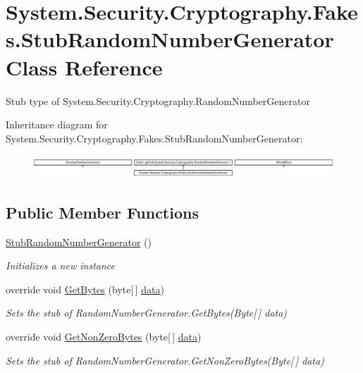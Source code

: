 \hypertarget{class_system_1_1_security_1_1_cryptography_1_1_fakes_1_1_stub_random_number_generator}{\section{System.\-Security.\-Cryptography.\-Fakes.\-Stub\-Random\-Number\-Generator Class Reference}
\label{class_system_1_1_security_1_1_cryptography_1_1_fakes_1_1_stub_random_number_generator}
}


Stub type of System.\-Security.\-Cryptography.\-Random\-Number\-Generator 


Inheritance diagram for System.\-Security.\-Cryptography.\-Fakes.\-Stub\-Random\-Number\-Generator\-:\begin{figure}[H]
\begin{center}
\leavevmode
\includegraphics[height=0.862202cm]{class_system_1_1_security_1_1_cryptography_1_1_fakes_1_1_stub_random_number_generator}
\end{center}
\end{figure}
\subsection*{Public Member Functions}
\begin{DoxyCompactItemize}
\item 
\hyperlink{class_system_1_1_security_1_1_cryptography_1_1_fakes_1_1_stub_random_number_generator_a9cba70d74b1e7b84302026b25e31eb3c}{Stub\-Random\-Number\-Generator} ()
\begin{DoxyCompactList}\small\item\em Initializes a new instance\end{DoxyCompactList}\item 
override void \hyperlink{class_system_1_1_security_1_1_cryptography_1_1_fakes_1_1_stub_random_number_generator_aa9295beffd75ff50a564fe870eea6c6e}{Get\-Bytes} (byte\mbox{[}$\,$\mbox{]} \hyperlink{jquery-1_810_82-vsdoc_8js_a609407b3456fdc3c5671a9fc4a226ff7}{data})
\begin{DoxyCompactList}\small\item\em Sets the stub of Random\-Number\-Generator.\-Get\-Bytes(\-Byte\mbox{[}$\,$\mbox{]} data)\end{DoxyCompactList}\item 
override void \hyperlink{class_system_1_1_security_1_1_cryptography_1_1_fakes_1_1_stub_random_number_generator_ab6be66818a3855ef51de17ab68b00596}{Get\-Non\-Zero\-Bytes} (byte\mbox{[}$\,$\mbox{]} \hyperlink{jquery-1_810_82-vsdoc_8js_a609407b3456fdc3c5671a9fc4a226ff7}{data})
\begin{DoxyCompactList}\small\item\em Sets the stub of Random\-Number\-Generator.\-Get\-Non\-Zero\-Bytes(\-Byte\mbox{[}$\,$\mbox{]} data)\end{DoxyCompactList}\end{DoxyCompactItemize}
